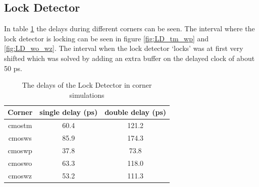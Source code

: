 \documentclass[a4paper,12pt]{article} \usepackage{graphicx}
\begin{document}
\subsection{Lock Detector}
In table \ref{tab:LD_delays_corner} the delays during different corners
can be seen. The interval where the lock detector is locking can be
seen in figure \ref{fig:LD_tm_wp} and \ref{fig:LD_wo_wz}. The
interval when the lock detector `locks' was at first very shifted
which was solved by adding an extra buffer on the delayed clock of
about 50 ps.
\begin{table}[h]
        \centering
        \begin{tabular}{|c|c|c|}
                \hline
                \textbf{Corner} & \textbf{single delay (ps)} &
                \textbf{double delay (ps)} \\
                \hline
                cmostm & 60.4 & 121.2 \\
                cmosws & 85.9 & 174.3 \\
                cmoswp & 37.8 & 73.8 \\
                cmoswo & 63.3 & 118.0 \\
                cmoswz & 53.2 & 111.3 \\
                \hline
        \end{tabular}
        \caption{The delays of the Lock Detector in corner simulations}
        \label{tab:LD_delays_corner}
\end{table}
\end{document}
